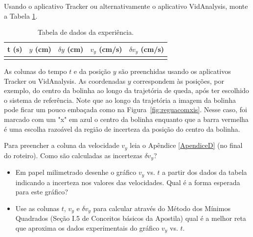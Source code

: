 Usando o aplicativo Tracker ou alternativamente o aplicativo  VidAnalysis, monte a Tabela \ref{tabela1}.
\begin{table}[h!]
\centering
\begin{tabular}{c|c|c|c|c}
t (s) & $y$ (cm) & $\delta y$ (cm)& $v_y$ (cm/s)& $\delta v_y$ (cm/s)\\
\hline 
&&&& 
\end{tabular}
\caption{Tabela de dados da experiência.}
\label{tabela1}
\end{table}
\par
\begin{minipage}[c]{11.5cm}
\hskip 0.5cm
As colunas do tempo $t$ e da posição $y$ são preenchidas usando os aplicativos Tracker 
ou  VidAnalysis. As coordenadas $y$ correspondem às posições, por exemplo, do centro da bolinha ao longo da trajetória de queda, após ter escolhido o sistema de referência. Note que ao longo da trajetória a imagem da bolinha pode ficar um pouco embaçada como na Figura~\ref{fig:reguacomxis}. 
Nesse caso, foi marcado com um "x"  em azul 
o centro da bolinha enquanto que a barra vermelha é uma escolha razoável da região de incerteza
da posição do centro da bolinha.  
\par
\hskip 0.5cm
Para preencher a coluna da velocidade $v_y$ leia o Apêndice \ref{ApendiceD} (no final do roteiro).
Como são calculadas as incertezas $\delta v_y$?
\par 
\begin{itemize}
\item Em papel milimetrado desenhe o gráfico $v_y$ vs. $t$ a partir dos dados da tabela indicando 
a incerteza nos valores das velocidades. Qual é a forma esperada para este gráfico?
\item Use as colunas $t$, $v_y$ e $\delta v_y$ para  calcular através do Método dos Mínimos Quadrados (Seção I.5  de Conceitos básicos da Apostila) qual é a melhor reta que aproxima os dados experimentais do gráfico $v_y$ vs. $t$. 
\end{itemize}
\end{minipage}
\hskip 0.2cm
